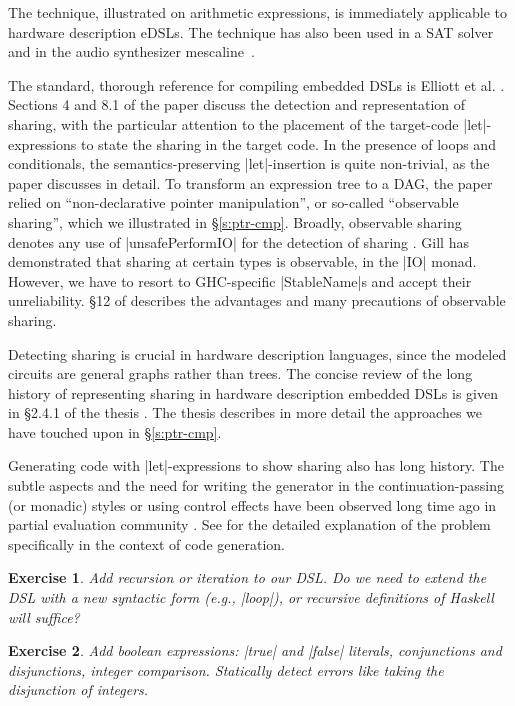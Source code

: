 \documentclass[submission,copyright,creativecommons]{eptcs}
\newtheorem{Exercise}{Exercise} \newcommand\aside[1]{}
\begin{document}
\begin{code}
The technique, illustrated on arithmetic expressions, is immediately
applicable to hardware description eDSLs. The technique has also been
used in a SAT solver~\cite{funsat} and in the audio
synthesizer mescaline~\cite{mescaline}.

The standard, thorough reference for compiling embedded DSLs is
Elliott et al. \cite{elliott-compiling}. Sections 4 and 8.1 of the
paper discuss the detection and representation of sharing, with the
particular attention to the placement of the target-code
|let|-expressions to state the sharing in the target code. In the
presence of loops and conditionals, the semantics-preserving
|let|-insertion is quite non-trivial, as the paper discusses in
detail. To transform an expression tree to a DAG, the paper relied on
``non-declarative pointer manipulation'', or so-called ``observable
sharing'', which we illustrated in \S\ref{s:ptr-cmp}.  Broadly,
observable sharing denotes any use of |unsafePerformIO| for the
detection of sharing \cite{Naylor-obs-sharing}. Gill
\cite{Gill-observable} has demonstrated that sharing at certain types is
observable, in the |IO| monad. However, we have to resort to
GHC-specific |StableName|s  and accept their unreliability. \S12 of
\cite{Gill-observable} describes the advantages and many precautions of
observable sharing. 

Detecting sharing is crucial in hardware description languages, since
the modeled circuits are general graphs rather than trees.  The
concise review of the long history of representing sharing in hardware
description embedded DSLs is given in \S2.4.1 of the thesis
\cite{acosta-hardware}.  The thesis describes in more detail the
approaches we have touched upon in \S\ref{s:ptr-cmp}.

Generating code with |let|-expressions to show sharing also has long
history.  The subtle aspects and the need for writing the generator in
the continuation-passing (or monadic) styles or using control effects
have been observed long time ago in partial evaluation community
\cite{bondorf-improving}. See \cite[\S3.1]{carette-multi-stage-scp}
for the detailed explanation of the problem specifically in the
context of code generation.


\begin{Exercise}
Add recursion or iteration to our DSL. Do we need to extend the DSL
with a new syntactic form (e.g., |loop|), or recursive definitions of
Haskell will suffice?
\end{Exercise}

\begin{Exercise}
Add boolean expressions: |true| and |false| literals, conjunctions and
disjunctions, integer comparison. Statically detect errors like taking
the disjunction of integers.
\end{Exercise}


\end{code}
\end{document}
